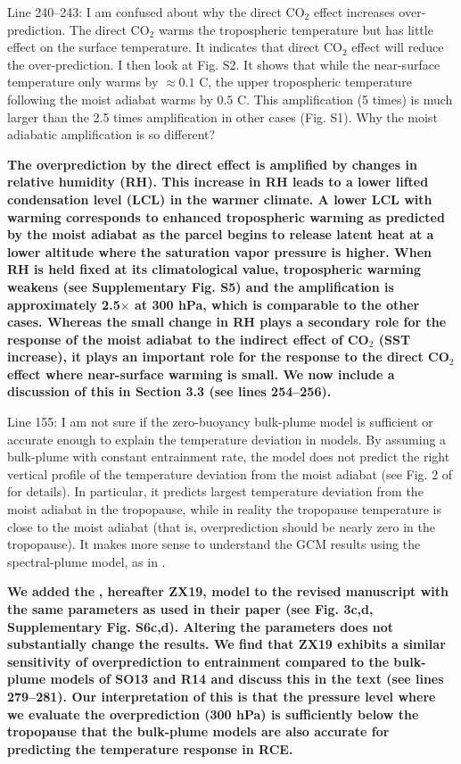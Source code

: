 \documentclass[11pt]{article}
\begin{document}
Line 240--243: I am confused about why the direct CO\(_2\) effect increases over-prediction. The direct CO\(_2\) warms the tropospheric temperature but has little effect on the surface temperature. It indicates that direct CO\(_2\) effect will reduce the over-prediction. I then look at Fig. S2. It shows that while the near-surface temperature only warms by \(\approx0.1\) C, the upper tropospheric temperature following the moist adiabat warms by \(0.5\) C. This amplification (5 times) is much larger than the 2.5 times amplification in other cases (Fig. S1). Why the moist adiabatic amplification is so different?

\textbf{The overprediction by the direct effect is amplified by changes in relative humidity (RH). This increase in RH leads to a lower lifted condensation level (LCL) in the warmer climate. A lower LCL with warming corresponds to enhanced tropospheric warming as predicted by the moist adiabat as the parcel begins to release latent heat at a lower altitude where the saturation vapor pressure is higher. When RH is held fixed at its climatological value, tropospheric warming weakens (see Supplementary Fig. S5) and the amplification is approximately 2.5\(\times\) at 300 hPa, which is comparable to the other cases. Whereas the small change in RH plays a secondary role for the response of the moist adiabat to the indirect effect of CO\(_2\) (SST increase), it plays an important role for the response to the direct CO\(_2\) effect where near-surface warming is small. We now include a discussion of this in Section 3.3 (see lines 254--256).}

Line 155: I am not sure if the zero-buoyancy bulk-plume model is sufficient or accurate enough to explain the temperature deviation in models. By assuming a bulk-plume with constant entrainment rate, the model does not predict the right vertical profile of the temperature deviation from the moist adiabat (see Fig. 2 of \cite{zhou_conceptual_2019} for details). In particular, it predicts largest temperature deviation from the moist adiabat in the tropopause, while in reality the tropopause temperature is close to the moist adiabat (that is, overprediction should be nearly zero in the tropopause). It makes more sense to understand the GCM results using the spectral-plume model, as in \cite{zhou_conceptual_2019}.

\textbf{We added the} \cite{zhou_conceptual_2019} \textbf{, hereafter ZX19, model to the revised manuscript with the same parameters as used in their paper (see Fig. 3c,d, Supplementary Fig. S6c,d). Altering the parameters does not substantially change the results. We find that ZX19 exhibits a similar sensitivity of overprediction to entrainment compared to the bulk-plume models of SO13 and R14 and discuss this in the text (see lines 279--281). Our interpretation of this is that the pressure level where we evaluate the overprediction (300 hPa) is sufficiently below the tropopause that the bulk-plume models are also accurate for predicting the temperature response in RCE.}
\end{document}
